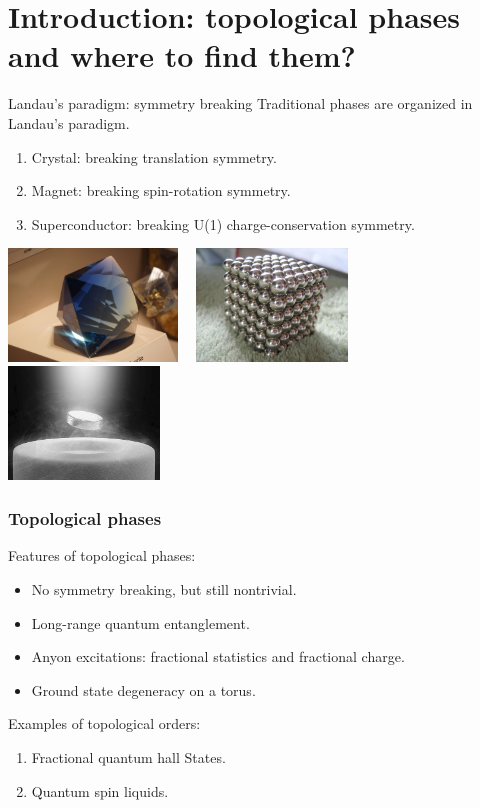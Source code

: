 \documentclass[xcolor=table, 10pt, aspectratio=169]{beamer}
\begin{document}
\section{Introduction: topological phases and where to find them?}

\begin{frame}{Landau's paradigm: symmetry breaking}
  Traditional phases are organized in Landau's paradigm.
  \begin{enumerate}
  \item Crystal: breaking translation symmetry.
  \item Magnet: breaking spin-rotation symmetry.
  \item Superconductor: breaking U(1) charge-conservation symmetry.
  \end{enumerate}
  \begin{center}
    \includegraphics[height=3cm]{../resources/crystal}~~
    \includegraphics[height=3cm]{../resources/magnet}~~
    \includegraphics[height=3cm]{../resources/sc}
  \end{center}
\end{frame}

\begin{frame}
  \frametitle{Topological phases}
  Features of topological phases:
  \begin{itemize}
  \item No symmetry breaking, but still nontrivial.
  \item Long-range quantum entanglement.
  \item Anyon excitations: fractional statistics and fractional charge.
  \item Ground state degeneracy on a torus.
  \end{itemize}
  Examples of topological orders:
  \begin{enumerate}
  \item Fractional quantum hall States.
  \item Quantum spin liquids.
\end{enumerate}
\end{frame}
\end{document}
